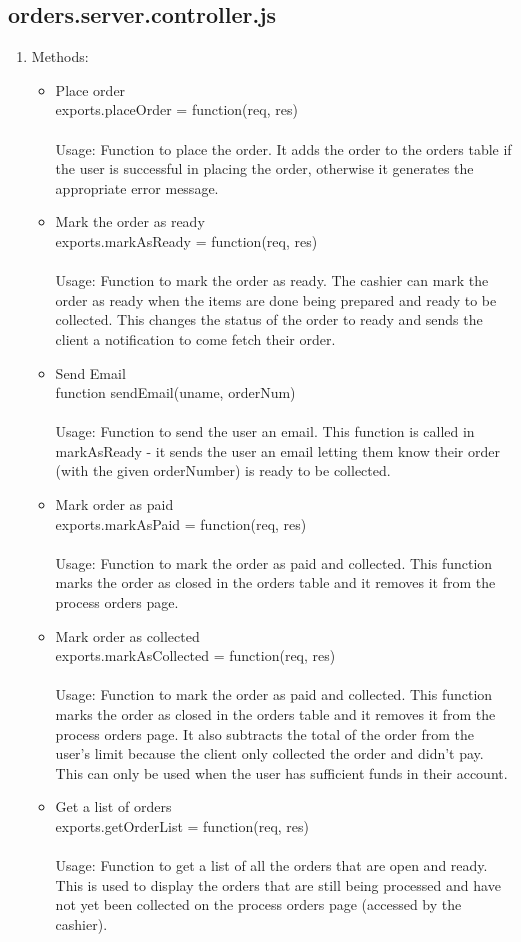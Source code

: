 \documentclass[a4paper,12pt]{article}
\begin{document}
\subsection{orders.server.controller.js}
\begin{enumerate} 
\item Methods:
\begin{itemize}
\item Place order \\ exports.placeOrder = function(req, res) 
\\ \\ Usage: Function to place the order. It adds the order to the orders table if the user is successful in placing the order, otherwise it generates the appropriate error message.
\item Mark the order as ready \\ exports.markAsReady = function(req, res) 
\\ \\ Usage: Function to mark the order as ready. The cashier can mark the order as ready when the items are done being prepared and ready to be collected. This changes the status of the order to ready and sends the client a notification to come fetch their order.
\item Send Email \\ function sendEmail(uname, orderNum) 
\\ \\ Usage: Function to send the user an email. This function is called in markAsReady - it sends the user an email letting them know their order (with the given orderNumber) is ready to be collected.
\item Mark order as paid \\ exports.markAsPaid = function(req, res) 
\\ \\ Usage: Function to mark the order as paid and collected. This function marks the order as closed in the orders table and it removes it from the process orders page.
\item Mark order as collected \\ exports.markAsCollected = function(req, res) 
\\ \\ Usage: Function to mark the order as paid and collected. This function marks the order as closed in the orders table and it removes it from the process orders page. It also subtracts the total of the order from the user's limit because the client only collected the order and didn't pay. This can only be used when the user has sufficient funds in their account.
\item Get a list of orders \\ exports.getOrderList = function(req, res) 
\\ \\ Usage: Function to get a list of all the orders that are open and ready. This is used to display the orders that are still being processed and have not yet been collected on the process orders page (accessed by the cashier).
\end{itemize}
\end{enumerate}
\end{document}
